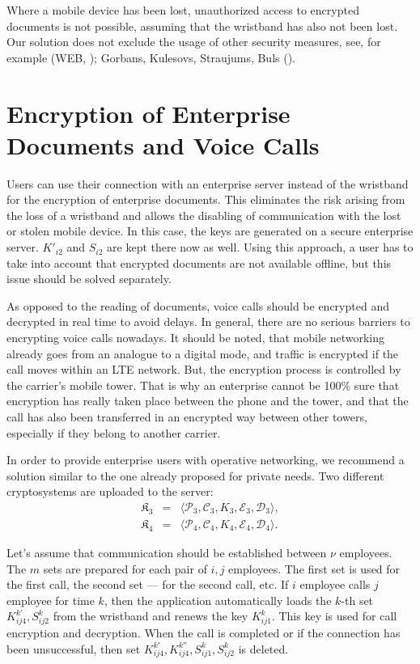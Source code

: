 \documentclass{bjmc}
\begin{document}
Where a mobile device has been lost, unauthorized access to encrypted documents is not possible, assuming that the wristband has also not been lost.
Our solution does not exclude the usage of other security measures, see, for example (WEB, \cite{Gar});  Gorbans,  Kulesovs,  Straujums,  Buls (\cite{Gor}). 

\section{Encryption of Enterprise Documents and Voice Calls}

Users can use their connection with an enterprise server instead of the wristband for the encryption of enterprise documents.  This eliminates the risk arising from the loss of a wristband
and allows the disabling of communication with the lost or stolen mobile device. In this case, the keys are generated on a secure enterprise server. 
$K'_{i2}$ and $S_{i2}$ are kept there now as well. Using this approach, a user has to take into account that encrypted documents are not available offline, but this issue should be 
solved separately.


As opposed to the reading of documents, voice calls should be encrypted and decrypted in real time to avoid delays.
In general, there are no serious barriers to encrypting voice calls nowadays. It should be noted, that mobile networking already goes from an analogue 
to a digital mode, and traffic is encrypted if the call moves within an LTE network. But, the encryption process is controlled by the carrier's mobile tower. 
That is why an enterprise cannot be 100\%  sure that encryption has really taken place between the phone and the tower, and that the call has also been transferred in 
an encrypted way between other towers, especially if they belong to another carrier.

In order to provide enterprise users with operative networking, we recommend a solution similar to the one already proposed for private needs. Two different cryptosystems 
are uploaded to the server:
\begin{eqnarray*}
\mathfrak{K}_3&=&\langle \mathcal{P}_3, \mathcal{C}_3, K_3, \mathcal{E}_3, \mathcal{D}_3 \rangle,\\
\mathfrak{K}_4&=&\langle \mathcal{P}_4, \mathcal{C}_4, K_4, \mathcal{E}_4, \mathcal{D}_4 \rangle.
\end{eqnarray*}

Let's assume that communication should be established between $\nu$ employees. 
The $m$ sets are prepared for each pair of $i,j$ employees. The first set is used for the first call, the second set --- for the second call, etc. If $i$ employee calls $j$
employee for time  $k$, then the application  automatically loads the 
$k$-th set $ K^{k'}_{ij4}, S^k_{ij2}$ from the wristband and renews
 the key $K^k_{ij1}$. This key is used for call encryption and decryption. When the call is completed or if the connection has been unsuccessful, then
 set $K_{ij4}^{k'}, K_{ij4}^{k''}, S_{ij1}^k,S_{ij2}^k$
 is deleted.
\end{document}

